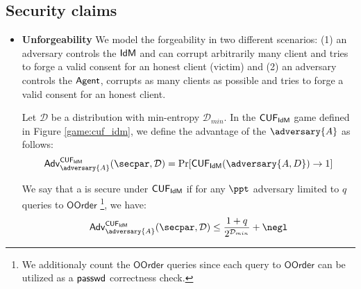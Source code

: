 \subsection{Security claims}
\begin{itemize}
    \item \textbf{Unforgeability} We model the forgeability in two different scenarios: (1) an adversary controls the $\textsf{IdM}$ and can corrupt arbitrarily many client and tries to forge a valid consent for an honest client (victim) and (2) an adversary controls the $\textsf{Agent}$, corrupts as many clients as possible and tries to forge a valid consent for an honest client.


    \begin{definition}
    Let $\mathcal{D}$ be a distribution with min-entropy $\mathcal{D}_{min}$.
    In the $\mathsf{CUF}_{\textsf{IdM}}$ game defined in Figure \ref{game:cuf_idm}, we define the advantage of the $\adversary{A}$ as follows:
    \begin{align*}
    \advtg_\adversary{A}^{\cuf_\idm}(\secpar, \mathcal{D}) = \Pr[\cuf_\idm(\adversary{A, D}) \rightarrow 1] 
    \end{align*}

We say that a \primitive is secure under $\mathsf{CUF}_{\textsf{IdM}}$ if for any $\ppt$ adversary  limited to $q$ queries to $\mathsf{OOrder}$ \footnote{We additionaly count the $\mathsf{OOrder}$ queries since each query to $\mathsf{OOrder}$ can be utilized as a $\textsf{passwd}$ correctness check.}, we have:
\begin{align*}
    \advtg_\adversary{A}^{\cuf_\idm}(\secpar, \mathcal{D})  \le \frac{1+q}{2^{\mathcal{D}_{min}}} + \negl
\end{align*}

\begin{figure*}
\scalebox{.9}{\vbox{%
\begin{pchstack}[center, space=0.2cm, boxed]
    \begin{pcvstack}
    

\end{pcvstack}
\end{pchstack}}}
\end{figure*}
\end{definition}
\end{itemize}
